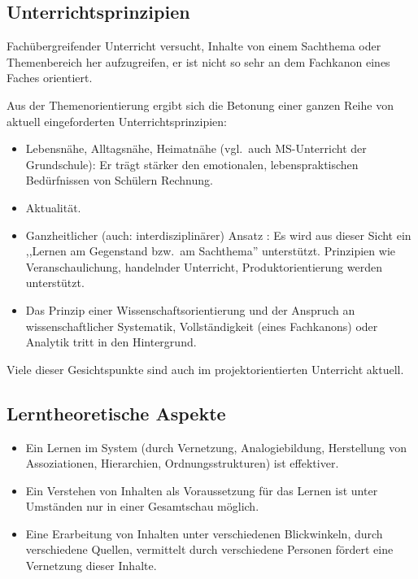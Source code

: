 \subsection{Unterrichtsprinzipien}
Fach\"{u}bergreifender Unterricht versucht,
Inhalte von einem Sachthema oder Themenbereich her aufzugreifen,
er ist nicht so sehr an dem Fachkanon eines Faches orientiert.

Aus der Themenorientierung ergibt sich die Betonung einer
ganzen Reihe von aktuell eingeforderten Unterrichtsprinzipien:
\begin{itemize}
\setlength{\itemsep}{0mm}
\item
Lebensn\"{a}he, Alltagsn\"{a}he, Heimatn\"{a}he
(vgl.\ auch MS-Unterricht der Grundschule):
Er tr\"{a}gt st\"{a}rker den emotionalen, lebenspraktischen Bed\"{u}rfnissen
von Sch\"{u}lern Rechnung.
\item
Aktualit\"{a}t.
\item
Ganzheitlicher (auch: interdisziplin\"{a}rer) Ansatz :
Es wird aus dieser Sicht ein
,,Lernen am Gegenstand bzw.\ am Sachthema'' unterst\"{u}tzt.
Prinzipien wie Veranschaulichung, handelnder Unterricht,
Produktorientierung werden unterst\"{u}tzt.
\item
Das Prinzip einer Wissenschaftsorientierung und der Anspruch an
wissenschaftlicher Systematik, Vollst\"{a}ndigkeit (eines Fachkanons)
oder Analytik tritt in den Hintergrund.
\end{itemize}

Viele dieser Gesichtspunkte sind auch im projektorientierten
Unterricht aktuell.

\subsection{Lerntheoretische Aspekte}
\begin{itemize}
\setlength{\itemsep}{0mm}
\item
Ein Lernen im System (durch Vernetzung,
Analogiebildung, Herstellung von Assoziationen, Hierarchien,
Ordnungsstrukturen) ist effektiver.

\item
Ein Verstehen von Inhalten als Voraussetzung f\"{u}r das Lernen
ist unter Umst\"{a}nden nur in einer Gesamtschau m\"{o}glich.
\item
Eine Erarbeitung von Inhalten unter verschiedenen Blickwinkeln,
durch verschiedene Quellen, vermittelt durch verschiedene
Personen f\"{o}rdert eine Vernetzung dieser Inhalte.
\end{itemize}

